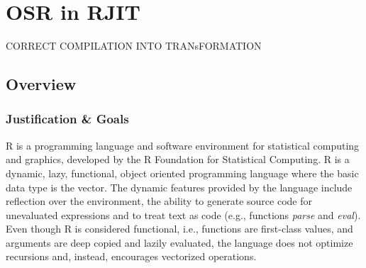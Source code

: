 
\chapter{OSR in RJIT} %

\label{Chapter4New} %


\newcommand{\keyword}[1]{\textbf{#1}}
\newcommand{\tabhead}[1]{\textbf{#1}}
\newcommand{\code}[1]{\texttt{#1}}
\newcommand{\file}[1]{\texttt{\bfseries#1}}
\newcommand{\option}[1]{\texttt{\itshape#1}}

CORRECT COMPILATION INTO TRANsFORMATION\\

\section{Overview}
\subsection{Justification \& Goals}\label{justificationgoals}
            
R is a programming language and software environment for statistical computing and graphics, developed by the R Foundation for Statistical Computing\cite{RURL}.
R is a dynamic, lazy, functional, object oriented programming language where the basic data type is the vector.
The dynamic features provided by the language include reflection over the environment, the ability to generate source code for unevaluated expressions and to treat text as code (e.g., functions \textit{parse} and \textit{eval}).
Even though R is considered functional, i.e., functions are first-class values, and arguments are deep copied and lazily evaluated, the language does not optimize recursions and, instead, encourages vectorized operations.\\

